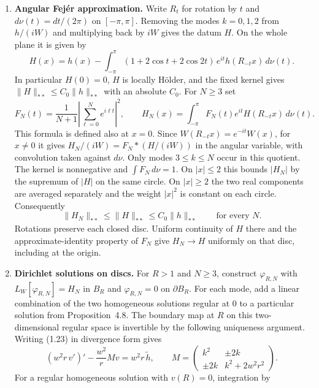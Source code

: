 \documentclass[11pt]{amsart}
\theoremstyle{definition}
\newcommand{\nss}[1]{\lVert #1\rVert_{**}}
\begin{document}
\begin{enumerate}[label=(\alph*)]
        in (A4), which yields a classical limit.
  \item \textbf{Angular Fej\'er approximation.} Write $R_t$ for rotation by $t$
        and $d\nu(t)=dt/(2\pi)$ on $[-\pi,\pi]$. Removing the modes $k=0,1,2$
        from $h/(iW)$ and multiplying back by $iW$ gives the datum $H$.
        On the whole plane it is given by
        \[
          H(x)=h(x)-\int_{-\pi}^{\pi}(1+2\cos t+2\cos 2t)\,
                               e^{it}h(R_{-t}x)\,d\nu(t).
        \]
        In particular $H(0)=0$, $H$ is locally H\"older, and the fixed kernel
        gives $\nss{H}\le C_0\nss h$ with an absolute $C_0$. For $N\ge3$ set
        \[
          F_N(t)=\frac{1}{N+1}\left|\sum_{\ell=0}^{N}e^{i\ell t}\right|^2,
          \qquad
          H_N(x)=\int_{-\pi}^{\pi}F_N(t)e^{it}H(R_{-t}x)\,d\nu(t).
        \]
        This formula is defined also at $x=0$. Since
        $W(R_{-t}x)=e^{-it}W(x)$, for $x\ne0$ it gives
        $H_N/(iW)=F_N*(H/(iW))$ in the angular variable, with convolution
        taken against $d\nu$. Only modes $3\le k\le N$ occur in this quotient.
        The kernel is nonnegative and $\int F_N\,d\nu=1$. On $|x|\le2$ this
        bounds $|H_N|$ by the supremum of $|H|$ on the same circle. On
        $|x|\ge2$ the two real components are averaged separately and the
        weight $|x|^2$ is constant on each circle. Consequently
        \[
            \nss{H_N}\le\nss H\le C_0\nss h
                  \qquad\text{for every }N .
        \]
        Rotations preserve each closed disc. Uniform continuity of $H$ there
        and the approximate-identity property of $F_N$ give $H_N\to H$
        uniformly on that disc, including at the origin.
  \item \textbf{Dirichlet solutions on discs.} For $R>1$ and $N\ge3$, construct
        $\varphi_{R,N}$ with $L_W[\varphi_{R,N}]=H_N$ in $B_R$ and
        $\varphi_{R,N}=0$ on $\partial B_R$. For each mode, add a linear
        combination of the two homogeneous solutions regular at $0$ to a
        particular solution from Proposition~4.8. The boundary map at $R$
        on this two-dimensional regular space is invertible by the following
        uniqueness argument. Writing (1.23) in divergence form gives
        \[
          (w^2r\,v')'-\frac{w^2}{r}M v=w^2r\,\widetilde h,\qquad
          M=\begin{pmatrix} k^2&\pm2k\\ \pm2k&k^2+2w^2r^2\end{pmatrix}.
        \]
        For a regular homogeneous solution with $v(R)=0$, integration by

\end{enumerate}
\end{document}
